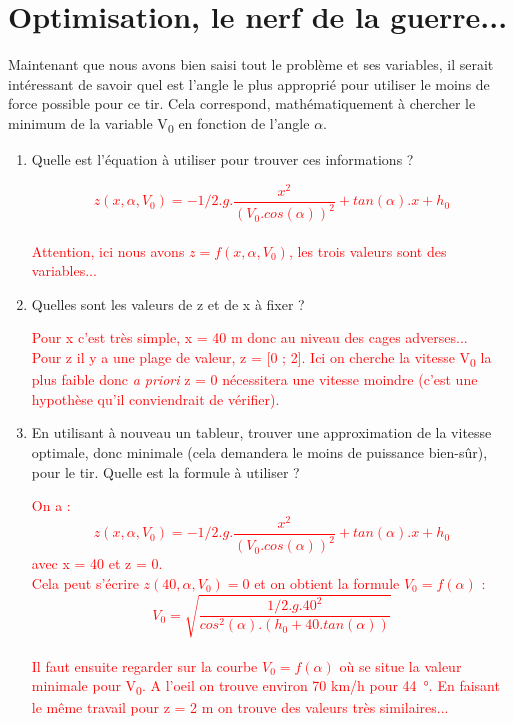 \documentclass[french,a4paper,10pt]{article}
\begin{document}
\section{Optimisation, le nerf de la guerre...}
Maintenant que nous avons bien saisi tout le problème et ses variables, il serait intéressant de savoir quel est l'angle le plus approprié pour utiliser le moins de force possible pour ce tir. Cela correspond, mathématiquement à chercher le minimum de la variable V\textsubscript{0} en fonction de l'angle $\alpha$.

\begin{enumerate}
    \item Quelle est l'équation à utiliser pour trouver ces informations ?\\
\begin{reponse}
\textcolor{red}{$$z(x,\alpha,V_0) = - 1/2 . g . \frac{x^2}{(V_{0}. cos(\alpha))^2} + tan(\alpha) . x + h_0$$\\
Attention, ici nous avons $z = f(x,\alpha,V_0)$, les trois valeurs sont des variables...}
\end{reponse}

    \item Quelles sont les valeurs de z et de x à fixer ?\\
\begin{reponse}
\textcolor{red}{Pour x c'est très simple, x = 40 m donc au niveau des cages adverses...\\
Pour z il y a une plage de valeur, z = [0 ; 2]. Ici on cherche la vitesse V\textsubscript{0} la plus faible donc \emph{a priori} z = 0 nécessitera une vitesse moindre (c'est une hypothèse qu'il conviendrait de vérifier).}
\end{reponse}

    \item En utilisant à nouveau un tableur, trouver une approximation de la vitesse optimale, donc minimale (cela demandera le moins de puissance bien-sûr), pour le tir. Quelle est la formule à utiliser ? \\
\begin{reponse}
    \textcolor{red}{On a :\\
$$z(x,\alpha,V_0) = - 1/2 . g . \frac{x^2}{(V_{0}. cos(\alpha))^2} + tan(\alpha) . x + h_0$$ avec x = 40 et z = 0.\\
 Cela peut s'écrire $ z(40,\alpha,V_0) = 0$ et on obtient la formule $V_0 = f(\alpha)$ :\\
$$V_0 = \sqrt{\frac{1/2 . g . 40^2}{cos^2(\alpha) . (h_0 + 40 . tan(\alpha))}}$$\\
Il faut ensuite regarder sur la courbe $V_0 = f(\alpha)$ où se situe la valeur minimale pour V\textsubscript{0}. A l'oeil on trouve environ 70 km/h pour 44~°. En faisant le même travail pour z = 2 m on trouve des valeurs très similaires...}
\end{reponse}

\end{enumerate}
\end{document}
